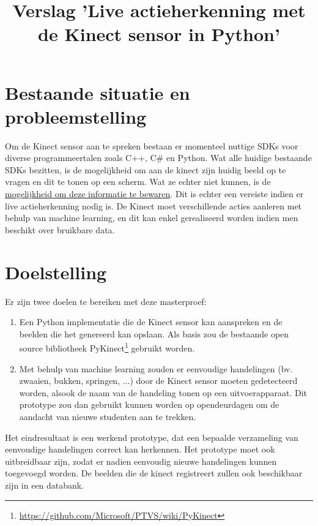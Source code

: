 \documentclass{article}
\title{Verslag 'Live actieherkenning met de Kinect sensor in Python'}
\begin{document}
   \maketitle

   \section{Bestaande situatie en probleemstelling}
    Om de Kinect sensor aan te spreken bestaan er momenteel nuttige SDKs voor diverse programmeertalen zoals C++, C\# en Python. Wat alle huidige bestaande SDKs bezitten, is de mogelijkheid om aan de kinect zijn huidig beeld op te vragen en dit te tonen op een scherm. Wat ze echter niet kunnen, is de \underline{mogelijkheid om deze informatie te bewaren}. Dit is echter een vereiste indien er live actieherkenning nodig is. De Kinect moet verschillende acties aanleren met behulp van machine learning, en dit kan enkel gerealiseerd worden indien men beschikt over bruikbare data. 
   \section{Doelstelling}
   Er zijn twee doelen te bereiken met deze masterproef:
   \begin{enumerate}
    \item Een Python implementatie die de Kinect sensor kan aanspreken en de beelden die het genereerd kan opslaan. Als basis zou de bestaande open source bibliotheek PyKinect\footnote{\url{https://github.com/Microsoft/PTVS/wiki/PyKinect}} gebruikt worden.
    \item Met behulp van machine learning zouden er eenvoudige handelingen (bv. zwaaien, bukken, springen, ...) door de Kinect sensor moeten gedetecteerd worden, alsook de naam van de handeling tonen op een uitvoerapparaat. Dit prototype zou dan gebruikt kunnen worden op opendeurdagen om de aandacht van nieuwe studenten aan te trekken.
   \end{enumerate}
   Het eindresultaat is een werkend prototype, dat een bepaalde verzameling van eenvoudige handelingen correct kan herkennen. Het prototype moet ook uitbreidbaar zijn, zodat er nadien eenvoudig nieuwe handelingen kunnen toegevoegd worden. De beelden die de kinect registreert zullen ook beschikbaar zijn in een databank.
\end{document}
